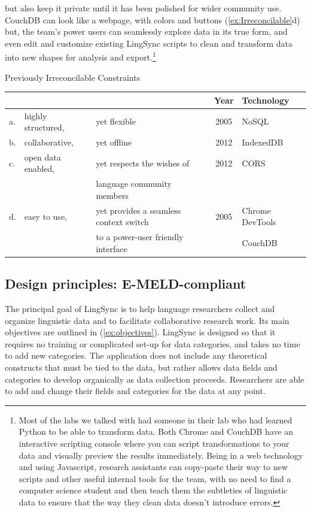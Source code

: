 \documentclass[letterpaper, 12pt, dvips]{mitwpl}
\begin{document}
  but also keep it private until it has been polished for wider community use. 
 CouchDB can look like a webpage, with colors and buttons (\ref{ex:Irreconcilable}d) but, the team's power users can seamlessly explore data in its true form, and even edit and customize existing LingSync scripts to clean and transform data into new shapes for analysis and export.\footnote{Most of the labs we talked with had someone in their lab who had learned Python to be able to transform data. Both Chrome and CouchDB have an interactive scripting console where you can script transformations to your data and visually preview the results immediately. Being in a web technology and using Javascript, research assistants can copy-paste their way to new scripts and other useful internal tools for the team, with no need to find a computer science student and then teach them the subtleties of linguistic data to ensure that the way they clean data doesn't introduce errors. } 

\begin{exe}
\ex  Previously Irreconcilable Constraints

\begin{tabular}{lllcl}
&& & Year & Technology \\\hline\hline
a. & highly structured, & yet flexible & 2005 & NoSQL\\\hline
b. & collaborative, & yet offline  & 2012 &  IndexedDB\\\hline
c. & open data enabled,  &yet respects the wishes of & 2012 & CORS \\
&&   language community members \\\hline
d. & easy to use,  &yet provides a seamless context switch  & 2005 & Chrome DevTools  \\
&& to a power-user friendly interface && CouchDB
\end{tabular}
\label{ex:Irreconcilable}
\end{exe}



\subsection{Design principles: E-MELD-compliant} 
\label{sec:design}

The principal goal of LingSync is to help language researchers collect and organize linguistic data and to facilitate collaborative research work. Its main objectives are outlined in (\ref{ex:objectives}). 
LingSync is designed so that it requires no training or complicated set-up for data categories, and takes no time to add new categories.  The application does not include any theoretical constructs that must be tied to the data, but rather allows data fields and categories to develop organically as data collection proceeds. Researchers are able to add and change their fields and categories for the data at any point. 
\end{document}
